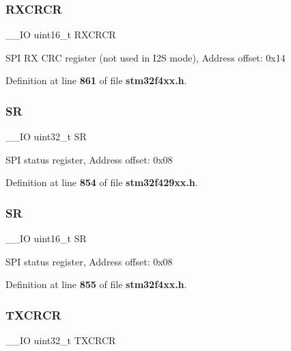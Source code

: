 \subsubsection{R\+X\+C\+R\+CR\hspace{0.1cm}{\footnotesize\ttfamily [2/2]}}
{\footnotesize\ttfamily \+\_\+\+\_\+\+IO uint16\+\_\+t R\+X\+C\+R\+CR}

S\+PI RX C\+RC register (not used in I2S mode), Address offset\+: 0x14 

Definition at line \textbf{ 861} of file \textbf{ stm32f4xx.\+h}.

\mbox{\label{structSPI__TypeDef_af6aca2bbd40c0fb6df7c3aebe224a360}} 
\subsubsection{SR\hspace{0.1cm}{\footnotesize\ttfamily [1/2]}}
{\footnotesize\ttfamily \+\_\+\+\_\+\+IO uint32\+\_\+t SR}

S\+PI status register, Address offset\+: 0x08 

Definition at line \textbf{ 854} of file \textbf{ stm32f429xx.\+h}.

\mbox{\label{structSPI__TypeDef_a44962ea5442d203bf4954035d1bfeb9d}} 
\subsubsection{SR\hspace{0.1cm}{\footnotesize\ttfamily [2/2]}}
{\footnotesize\ttfamily \+\_\+\+\_\+\+IO uint16\+\_\+t SR}

S\+PI status register, Address offset\+: 0x08 

Definition at line \textbf{ 855} of file \textbf{ stm32f4xx.\+h}.

\mbox{\label{structSPI__TypeDef_ab4e4328504fd66285df8264d410deefd}} 
\subsubsection{T\+X\+C\+R\+CR\hspace{0.1cm}{\footnotesize\ttfamily [1/2]}}
{\footnotesize\ttfamily \+\_\+\+\_\+\+IO uint32\+\_\+t T\+X\+C\+R\+CR}

